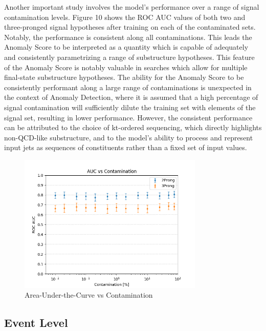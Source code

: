 \documentclass[12pt, a4paper]{article}
\begin{document}
Another important study involves the model’s performance over a range of signal contamination
levels. Figure 10 shows the ROC AUC values of both two and three-pronged signal hypotheses
after training on each of the contaminated sets. Notably, the performance is consistent along
all contaminations. This leads the Anomaly Score to be interpreted as a quantity which is
capable of adequately and consistently parametrizing a range of substructure hypotheses. This
feature of the Anomaly Score is notably valuable in searches which allow for multiple final-state substructure hypotheses. The ability for the Anomaly Score to be consistently performant along
a large range of contaminations is unexpected in the context of Anomaly Detection, where it
is assumed that a high percentage of signal contamination will sufficiently dilute the training
set with elements of the signal set, resulting in lower performance. However, the consistent
performance can be attributed to the choice of kt-ordered sequencing, which directly highlights
non-QCD-like substructure, and to the model’s ability to process and represent input jets as
sequences of constituents rather than a fixed set of input values.


\begin{figure}[H]
	\begin{center}
		\includegraphics[width=250pt]{imgs/AUC_vs_Contam.png}
	\end{center}
	\caption{Area-Under-the-Curve vs Contamination}
	\label{fig:aucs_vs_contam}
\end{figure}


\subsection{Event Level}
\end{document}
